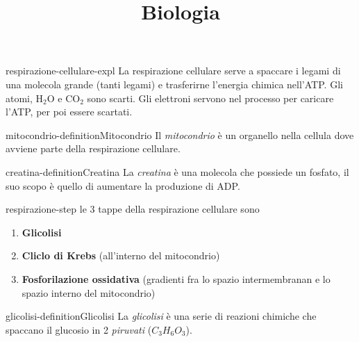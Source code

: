 \documentclass[preview]{standalone}
\begin{document}
\title{Biologia}
\genpage


\begin{snippet}{respirazione-cellulare-expl}
    La respirazione cellulare serve a spaccare i legami di una molecola grande
    (tanti legami) e trasferirne l'energia chimica nell'ATP.
    Gli atomi, H\({}_2\)O e CO\({}_2\) sono scarti. Gli elettroni servono nel processo per caricare l'ATP, per poi
    essere scartati.
\end{snippet}

\begin{snippetdefinition}{mitocondrio-definition}{Mitocondrio}
    Il \textit{mitocondrio} è un organello nella cellula dove avviene parte della respirazione cellulare.
\end{snippetdefinition}


\begin{snippetdefinition}{creatina-definition}{Creatina}
    La \textit{creatina} è una molecola che possiede un fosfato, il suo scopo è quello di aumentare la produzione di ADP.
\end{snippetdefinition}

\begin{snippet}{respirazione-step}
    le 3 tappe della respirazione cellulare sono
    \begin{enumerate}
        \item \textbf{Glicolisi}
        \item \textbf{Cliclo di Krebs} (all'interno del mitocondrio)
        \item \textbf{Fosforilazione ossidativa} (gradienti fra lo spazio intermembranan e lo spazio interno del mitocondrio)
    \end{enumerate}
\end{snippet}

\begin{snippetdefinition}{glicolisi-definition}{Glicolisi}
    La \textit{glicolisi} è una serie di reazioni chimiche che spaccano il glucosio in 2 \textit{piruvati} (\(C_3H_6O_3\)).
\end{snippetdefinition}
\end{document}
